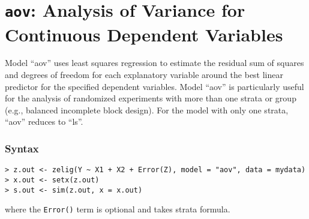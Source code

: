 \section{{\tt aov}: Analysis of Variance for Continuous Dependent Variables} 
\label{aov}

Model ``aov'' uses least squares regression to estimate the residual
sum of squares and degrees of freedom for each explanatory variable
around the best linear predictor for the specified dependent
variables. Model ``aov'' is particularly useful for the analysis of
randomized experiments with more than one strata or group (e.g.,
balanced incomplete block design).  For the model with only one
strata, ``aov'' reduces to ``ls''.

\subsubsection{Syntax}

\begin{verbatim}
> z.out <- zelig(Y ~ X1 + X2 + Error(Z), model = "aov", data = mydata)
> x.out <- setx(z.out)
> s.out <- sim(z.out, x = x.out)
\end{verbatim}
where the {\tt Error()} term is optional and takes strata formula.

